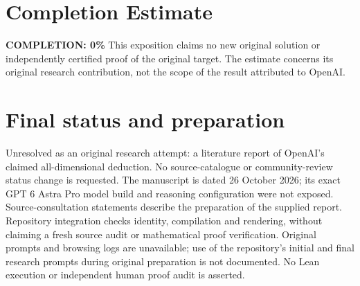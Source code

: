 \documentclass[11pt,a4paper]{article}
\numberwithin{equation}{section}
\theoremstyle{definition}
\theoremstyle{remark}
\begin{document}
\section{Completion Estimate}
\noindent\textbf{COMPLETION: 0\%}
This exposition claims no new original solution or independently certified proof of the original target. The estimate concerns its original research contribution, not the scope of the result attributed to OpenAI.

\section{Final status and preparation}
Unresolved as an original research attempt: a literature report of OpenAI's claimed all-dimensional deduction. No source-catalogue or community-review status change is requested. The manuscript is dated 26 October 2026; its exact GPT 6 Astra Pro model build and reasoning configuration were not exposed. Source-consultation statements describe the preparation of the supplied report. Repository integration checks identity, compilation and rendering, without claiming a fresh source audit or mathematical proof verification. Original prompts and browsing logs are unavailable; use of the repository's initial and final research prompts during original preparation is not documented. No Lean execution or independent human proof audit is asserted.
\end{document}
